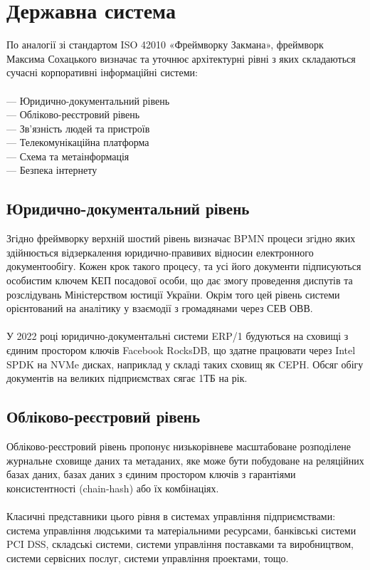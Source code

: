 \chapter{Державна система}

По аналогії зі стандартом ISO 42010 «Фреймворку Закмана»,
фреймворк Максима Сохацького визначає та уточнює архітектурні рівні
з яких складаються сучасні корпоративні інформаційні системи:
\\
\\
--- Юридично-документальний рівень\\
--- Обліково-реєстровий рівень\\
--- Зв'язність людей та пристроїв\\
--- Телекомунікаційна платформа\\
--- Схема та метаінформація\\
--- Безпека інтернету\\

\section{Юридично-документальний рівень}

Згідно фреймворку верхній шостий рівень визначає BPMN процеси згідно яких здійнюється
відзеркалення юридично-правивих відносин електронного документообігу. Кожен крок такого
процесу, та усі його документи підписуються особистим ключем КЕП посадової особи, що дає
змогу проведення диспутів та розслідувань Міністерством юстиції України. Окрім того цей
рівень системи орієнтований на аналітику у взаємодії з громадянами через СЕВ ОВВ.
\\
\\
У 2022 році юридично-документальні системи ERP/1 будуються на сховищі з єдиним
простором ключів Facebook RocksDB, що здатне працювати через Intel SPDK на NVMe
дисках, наприклад у складі таких сховищ як CEPH. Обсяг обігу документів на великих
підприємствах сягає 1ТБ на рік.

\newpage
\section{Обліково-реєстровий рівень}

Обліково-реєстровий рівень пропонує низькорівневе масштабоване розподілене
журнальне сховище даних та метаданих, яке може бути побудоване на реляційних
базах даних, базах даних з єдиним простором ключів з гарантіями
консистентності (chain-hash) або їх комбінаціях.
\\
\\
Класичні представники цього рівня в системах управління підприємствами: система
управління людськими та матеріальними ресурсами, банківські системи PCI DSS,
складські системи, системи управління поставками та виробництвом, системи сервісних
послуг, системи управління проектами, тощо.

